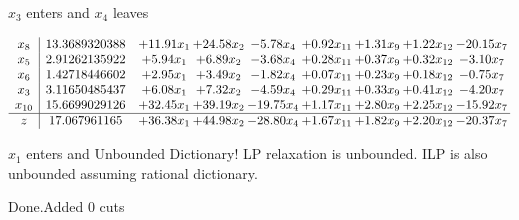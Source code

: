 \documentclass[8pt]{article}
\begin{document}
 $ x_{3} $ enters and $ x_{4} $ leaves 

 \[\begin{array}{c| c c@{\hskip 2pt} c@{\hskip 2pt} c@{\hskip 2pt} c@{\hskip 2pt} c@{\hskip 2pt} c@{\hskip 2pt} c@{\hskip 2pt} }
 x_{8}   &  13.3689320388 & + 11.91 x_{1} & + 24.58 x_{2} & -5.78 x_{4} & +  0.92 x_{11} & +  1.31 x_{9} & +  1.22 x_{12} & -20.15 x_{7}\\
 x_{5}   &  2.91262135922 & +  5.94 x_{1} & +  6.89 x_{2} & -3.68 x_{4} & +  0.28 x_{11} & +  0.37 x_{9} & +  0.32 x_{12} & -3.10 x_{7}\\
 x_{6}   &  1.42718446602 & +  2.95 x_{1} & +  3.49 x_{2} & -1.82 x_{4} & +  0.07 x_{11} & +  0.23 x_{9} & +  0.18 x_{12} & -0.75 x_{7}\\
 x_{3}   &  3.11650485437 & +  6.08 x_{1} & +  7.32 x_{2} & -4.59 x_{4} & +  0.29 x_{11} & +  0.33 x_{9} & +  0.41 x_{12} & -4.20 x_{7}\\
 x_{10}   &  15.6699029126 & + 32.45 x_{1} & + 39.19 x_{2} & -19.75 x_{4} & +  1.17 x_{11} & +  2.80 x_{9} & +  2.25 x_{12} & -15.92 x_{7}\\
\hline
z    &  17.067961165 & + 36.38 x_{1} & + 44.98 x_{2} & -28.80 x_{4} & +  1.67 x_{11} & +  1.82 x_{9} & +  2.20 x_{12} & -20.37 x_{7}\\
\end{array}\]


 $ x_{1} $ enters and Unbounded Dictionary!
 LP relaxation is unbounded. ILP is also unbounded assuming rational dictionary. 

Done.Added 0 cuts 
\end{document}
